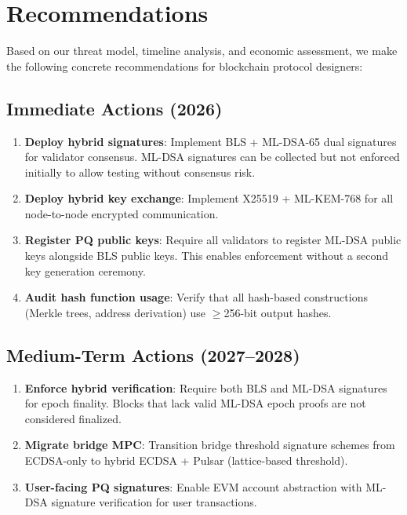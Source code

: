 \section{Recommendations}

\label{sec:recommendations}

Based on our threat model, timeline analysis, and economic assessment, we make the
following concrete recommendations for blockchain protocol designers:

\subsection{Immediate Actions (2026)}

\begin{enumerate}[leftmargin=2em]
  \item \textbf{Deploy hybrid signatures}: Implement BLS + ML-DSA-65 dual signatures
        for validator consensus. ML-DSA signatures can be collected but not enforced
        initially to allow testing without consensus risk.
  \item \textbf{Deploy hybrid key exchange}: Implement X25519 + ML-KEM-768 for all
        node-to-node encrypted communication.
  \item \textbf{Register PQ public keys}: Require all validators to register ML-DSA
        public keys alongside BLS public keys. This enables enforcement without
        a second key generation ceremony.
  \item \textbf{Audit hash function usage}: Verify that all hash-based constructions
        (Merkle trees, address derivation) use $\geq$256-bit output hashes.
\end{enumerate}

\subsection{Medium-Term Actions (2027--2028)}

\begin{enumerate}[leftmargin=2em]
  \item \textbf{Enforce hybrid verification}: Require both BLS and ML-DSA signatures
        for epoch finality. Blocks that lack valid ML-DSA epoch proofs are not
        considered finalized.
  \item \textbf{Migrate bridge MPC}: Transition bridge threshold signature schemes
        from ECDSA-only to hybrid ECDSA + Pulsar (lattice-based threshold).
  \item \textbf{User-facing PQ signatures}: Enable EVM account abstraction with
        ML-DSA signature verification for user transactions.
\end{enumerate}

